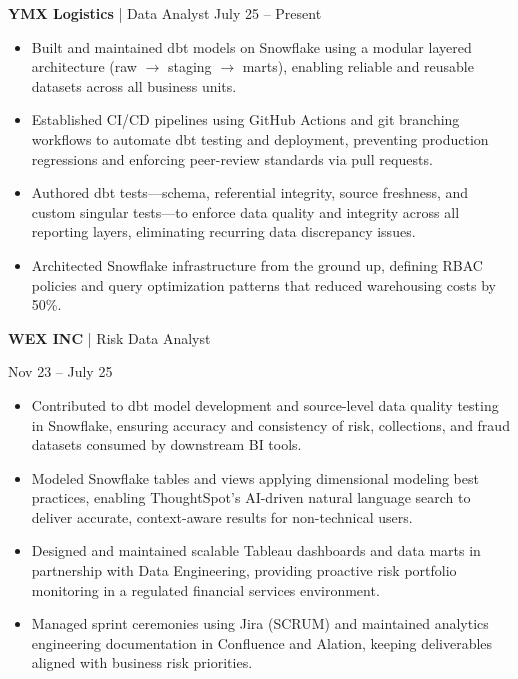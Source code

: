 \documentclass[9pt, letterpaper]{article}
\begin{document}
	\noindent \textbf{YMX Logistics} | Data Analyst \hfill July 25 -- Present
	\begin{itemize}[noitemsep, topsep=1pt, leftmargin=1.5em, rightmargin=0.5cm]
		\item Built and maintained dbt models on Snowflake using a modular layered architecture (raw $\rightarrow$ staging $\rightarrow$ marts), enabling reliable and reusable datasets across all business units.
		\item Established CI/CD pipelines using GitHub Actions and git branching workflows to automate dbt testing and deployment, preventing production regressions and enforcing peer-review standards via pull requests.
		\item Authored dbt tests—schema, referential integrity, source freshness, and custom singular tests—to enforce data quality and integrity across all reporting layers, eliminating recurring data discrepancy issues.
		\item Architected Snowflake infrastructure from the ground up, defining RBAC policies and query optimization patterns that reduced warehousing costs by 50\%.
	\end{itemize}

	\noindent \begin{minipage}[t]{0.75\textwidth}
		\textbf{WEX INC} | Risk Data Analyst
	\end{minipage}
	\begin{minipage}[t]{0.25\textwidth}
		\raggedleft Nov 23 -- July 25
	\end{minipage}

	\begin{itemize}[noitemsep, topsep=1pt, leftmargin=1.5em, rightmargin=0.5cm]
		\item Contributed to dbt model development and source-level data quality testing in Snowflake, ensuring accuracy and consistency of risk, collections, and fraud datasets consumed by downstream BI tools.
		\item Modeled Snowflake tables and views applying dimensional modeling best practices, enabling ThoughtSpot's AI-driven natural language search to deliver accurate, context-aware results for non-technical users.
		\item Designed and maintained scalable Tableau dashboards and data marts in partnership with Data Engineering, providing proactive risk portfolio monitoring in a regulated financial services environment.
		\item Managed sprint ceremonies using Jira (SCRUM) and maintained analytics engineering documentation in Confluence and Alation, keeping deliverables aligned with business risk priorities.
	\end{itemize}
\end{document}
